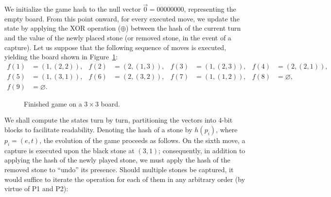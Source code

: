 We initialize the game hash to the null vector $\vec{0} = 00000000 $, representing the empty board. From this point onward, for every executed move, we update the state by applying the XOR operation ($\oplus$) between the hash of the current turn and the value of the newly placed stone (or removed stone, in the event of a capture). Let us suppose that the following sequence of moves is executed, yielding the board shown in Figure~\ref{fig:tablero_ejsko}:
 \begin{align*}
	f(1)&=(1,(2,2)), &f(2)&=(2,(1,3)),	&f(3)&=(1,(2,3)), &f(4)&=(2,(2,1)),\\
	f(5)&=(1,(3,1)), &f(6)&=(2,(3,2)), &f(7)&=(1,(1,2)), &f(8)&=\varnothing,\\
	f(9)&=\varnothing. 
\end{align*} 
\begin{figure}[H]
	\centering
	\begin{goban}[3]
	\end{goban}
	\quad
	\begin{goban}[3]
	\end{goban}
	\quad
	\begin{goban}[3]
	\end{goban}
	\caption{Finished game on a $3\times 3$ board.}
	\label{fig:tablero_ejsko}
\end{figure}
We shall compute the states turn by turn, partitioning the vectors into 4-bit blocks to facilitate readability. Denoting the hash of a stone by $h(p_i)$, where $p_i = (e, t)$, the evolution of the game proceeds as follows. On the sixth move, a capture is executed upon the black stone at $(3,1)$; consequently, in addition to applying the hash of the newly played stone, we must apply the hash of the removed stone to ``undo'' its presence. Should multiple stones be captured, it would suffice to iterate the operation for each of them in any arbitrary order (by virtue of P1 and P2):
